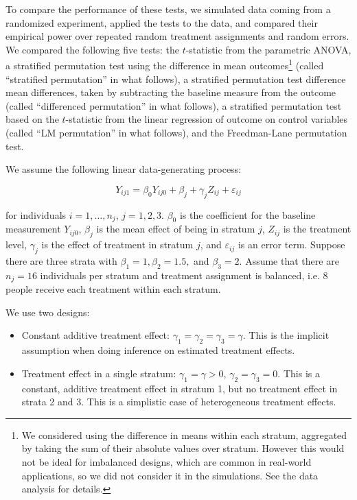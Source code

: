 \documentclass[11pt]{article}
\begin{document}
To compare the performance of these tests, we simulated data coming from a randomized experiment, applied the tests to the data, and compared their empirical power over repeated random treatment assignments and random errors.
We compared the following five tests:
the $t$-statistic from the parametric ANOVA,
a stratified permutation test using the difference in mean outcomes\footnote{ We considered using the difference in means within each stratum, aggregated by taking the sum of their absolute values over stratum. However this would not be ideal for imbalanced designs, which are common in real-world applications, so we did not consider it in the simulations.  See the data analysis for details.}
 (called ``stratified permutation'' in what follows),
a stratified permutation test difference mean differences, taken by subtracting the baseline measure from the outcome (called ``differenced permutation'' in what follows),
a stratified permutation test based on the $t$-statistic from the linear regression of outcome on control variables (called ``LM permutation'' in what follows),
and the Freedman-Lane permutation test.
 

We assume the following linear data-generating process:

$$Y_{ij1} =\beta_0Y_{ij0} + \beta_{j} + \gamma_j Z_{ij} + \varepsilon_{ij}$$

for individuals $i = 1, \dots, n_j$, $j = 1, 2, 3$.
$\beta_0$ is the coefficient for the baseline measurement $Y_{ij0}$, 
$\beta_j$ is the mean effect of being in stratum $j$, 
$Z_{ij}$ is the treatment level, 
$\gamma_j$ is the effect of treatment in stratum $j$, 
and $\varepsilon_{ij}$ is an error term.
Suppose there are three strata with $\beta_1 = 1, \beta_2 = 1.5,$ and $\beta_3 = 2$.
Assume that there are $n_j = 16$ individuals per stratum and treatment assignment is balanced, i.e. 8 people receive each treatment within each stratum.

We use two designs:
\begin{itemize}
\item Constant additive treatment effect: $\gamma_1 = \gamma_2 = \gamma_3 = \gamma$. This is the implicit assumption when doing inference on estimated treatment effects.
\item Treatment effect in a single stratum: $\gamma_1 = \gamma > 0$, $\gamma_2 = \gamma_3 = 0$. This is a constant, additive treatment effect in stratum 1, but no treatment effect in strata 2 and 3. This is a simplistic case of heterogeneous treatment effects.
\end{itemize}
\end{document}
